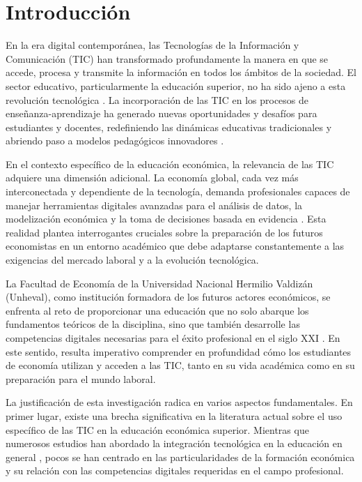 \documentclass[12pt, a4paper]{article}
\begin{document}
\tableofcontents
\newpage

\section{Introducción}

En la era digital contemporánea, las Tecnologías de la Información y Comunicación (TIC) han transformado profundamente la manera en que se accede, procesa y transmite la información en todos los ámbitos de la sociedad. El sector educativo, particularmente la educación superior, no ha sido ajeno a esta revolución tecnológica \parencite{castells2010}. La incorporación de las TIC en los procesos de enseñanza-aprendizaje ha generado nuevas oportunidades y desafíos para estudiantes y docentes, redefiniendo las dinámicas educativas tradicionales y abriendo paso a modelos pedagógicos innovadores \parencite{selwyn2016}.

En el contexto específico de la educación económica, la relevancia de las TIC adquiere una dimensión adicional. La economía global, cada vez más interconectada y dependiente de la tecnología, demanda profesionales capaces de manejar herramientas digitales avanzadas para el análisis de datos, la modelización económica y la toma de decisiones basada en evidencia \parencite{Becker2019}. Esta realidad plantea interrogantes cruciales sobre la preparación de los futuros economistas en un entorno académico que debe adaptarse constantemente a las exigencias del mercado laboral y a la evolución tecnológica.

La Facultad de Economía de la Universidad Nacional Hermilio Valdizán (Unheval), como institución formadora de los futuros actores económicos, se enfrenta al reto de proporcionar una educación que no solo abarque los fundamentos teóricos de la disciplina, sino que también desarrolle las competencias digitales necesarias para el éxito profesional en el siglo XXI \parencite{Fichman2014}. En este sentido, resulta imperativo comprender en profundidad cómo los estudiantes de economía utilizan y acceden a las TIC, tanto en su vida académica como en su preparación para el mundo laboral.

La justificación de esta investigación radica en varios aspectos fundamentales. En primer lugar, existe una brecha significativa en la literatura actual sobre el uso específico de las TIC en la educación económica superior. Mientras que numerosos estudios han abordado la integración tecnológica en la educación en general \parencite{Tondeur2017}, pocos se han centrado en las particularidades de la formación económica y su relación con las competencias digitales requeridas en el campo profesional.
\end{document}
